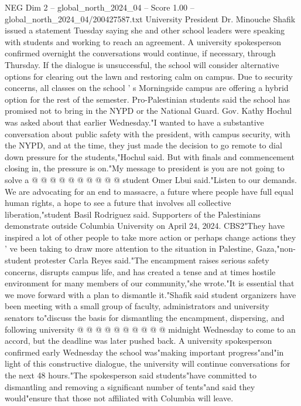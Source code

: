 \begin{textsample}{NEG Dim 2 – global\_north\_2024\_04 – Score 1.00 – global\_north\_2024\_04/200427587.txt}  \label{ex:f2_neg_187}
University President Dr.
Minouche Shafik issued a statement Tuesday saying she and other school leaders were speaking with students and working to reach an agreement.
A university spokesperson confirmed overnight the conversations would continue, if necessary, through Thursday.
If the dialogue is unsuccessful, the school will consider alternative options for clearing out the lawn and restoring calm on campus.
Due to security concerns, all classes on the school ' s Morningside campus are offering a hybrid option for the rest of the semester.
Pro-Palestinian students said the school has promised not to bring in the NYPD or the National Guard.
Gov.
Kathy Hochul was asked about that earlier Wednesday."I wanted to have a substantive conversation about public safety with the president, with campus security, with the NYPD, and at the time, they just made the decision to go remote to dial down pressure for the students,"Hochul said.
But with finals and commencement closing in, the pressure is on."My message to president is you are not going to solve a @ @ @ @ @ @ @ @ @ @ student Omer Lbui said."Listen to our demands.
We are advocating for an end to massacre, a future where people have full equal human rights, a hope to see a future that involves all collective liberation,"student Basil Rodriguez said.
Supporters of the Palestinians demonstrate outside Columbia University on April 24, 2024.
CBS2"They have inspired a lot of other people to take more action or perhaps change actions they ' ve been taking to draw more attention to the situation in Palestine, Gaza,"non-student protester Carla Reyes said."The encampment raises serious safety concerns, disrupts campus life, and has created a tense and at times hostile environment for many members of our community,"she wrote."It is essential that we move forward with a plan to dismantle it."Shafik said student organizers have been meeting with a small group of faculty, administrators and university senators to"discuss the basis for dismantling the encampment, dispersing, and following university @ @ @ @ @ @ @ @ @ @ midnight Wednesday to come to an accord, but the deadline was later pushed back.
A university spokesperson confirmed early Wednesday the school was"making important progress"and"in light of this constructive dialogue, the university will continue conversations for the next 48 hours."The spokesperson said students"have committed to dismantling and removing a significant number of tents"and said they would"ensure that those not affiliated with Columbia will leave.

\end{textsample}
